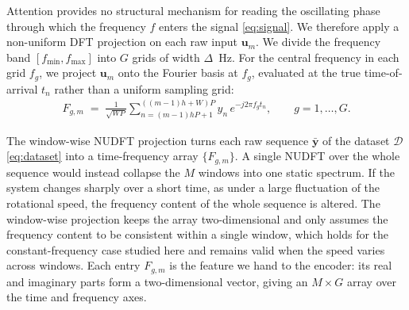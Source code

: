 \documentclass[journal,onecolumn]{IEEEtran}
\begin{document}
Attention provides no structural mechanism for reading the oscillating phase through which the frequency $f$ enters the signal \eqref{eq:signal}. We therefore apply a non-uniform DFT projection on each raw input $\mathbf{u}_m$. We divide the frequency band $[f_{\min}, f_{\max}]$ into $G$ grids of width $\Delta$~Hz. For the central frequency in each grid $f_g$, we project $\mathbf{u}_m$ onto the Fourier basis at $f_g$, evaluated at the true time-of-arrival $t_n$ rather than a uniform sampling grid:
\begin{eqnarray}
\label{eq:nudft}
F_{g,m} \;=\; \frac{1}{\sqrt{WP}}\sum_{n=(m-1)hP+1}^{((m-1)h+W)P} y_n\, e^{-j2\pi f_g t_n},
\qquad g=1,\dots,G.
\end{eqnarray}

The window-wise NUDFT projection turns each raw sequence $\bar{\mathbf{y}}$ of the dataset $\mathcal{D}$ \eqref{eq:dataset} into a time-frequency array $\{F_{g,m}\}$. A single NUDFT over the whole sequence would instead collapse the $M$ windows into one static spectrum. If the system changes sharply over a short time, as under a large fluctuation of the rotational speed, the frequency content of the whole sequence is altered. The window-wise projection keeps the array two-dimensional and only assumes the frequency content to be consistent within a single window, which holds for the constant-frequency case studied here and remains valid when the speed varies across windows. Each entry $F_{g,m}$ is the feature we hand to the encoder: its real and imaginary parts form a two-dimensional vector, giving an $M\times G$ array over the time and frequency axes.
\end{document}
